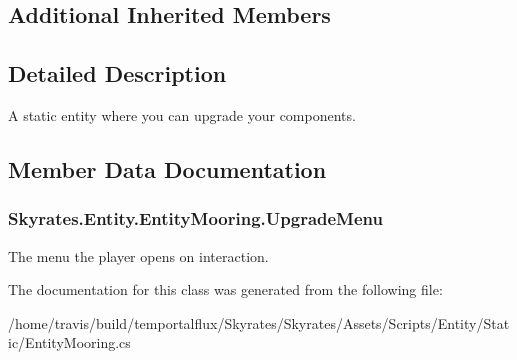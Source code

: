 \subsection*{Additional Inherited Members}


\subsection{Detailed Description}
A static entity where you can upgrade your components. 



\subsection{Member Data Documentation}
\hypertarget{class_skyrates_1_1_entity_1_1_entity_mooring_afea86c223b57c927c31d9b16201841fc}{
\subsubsection[{Upgrade\-Menu}]{ Skyrates.\-Entity.\-Entity\-Mooring.\-Upgrade\-Menu}}\label{class_skyrates_1_1_entity_1_1_entity_mooring_afea86c223b57c927c31d9b16201841fc}


The menu the player opens on interaction. 



The documentation for this class was generated from the following file\-:\begin{DoxyCompactItemize}
\item 
/home/travis/build/temportalflux/\-Skyrates/\-Skyrates/\-Assets/\-Scripts/\-Entity/\-Static/Entity\-Mooring.\-cs\end{DoxyCompactItemize}
